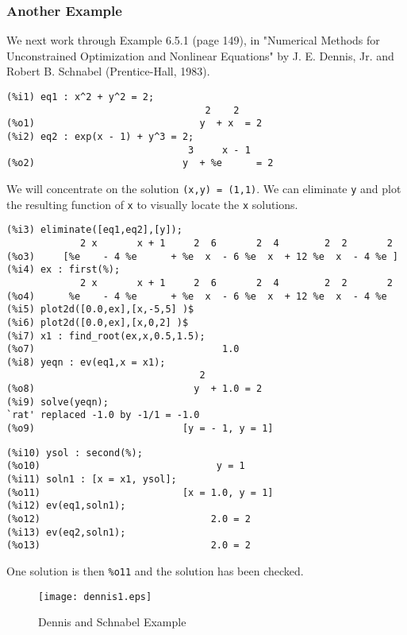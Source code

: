 \documentclass[12pt]{article}
\begin{document}
\subsubsection{Another Example}  
We next work through Example 6.5.1 (page 149), in "Numerical Methods for Unconstrained Optimization
  and Nonlinear Equations" by J. E. Dennis, Jr. and  Robert B. Schnabel (Prentice-Hall, 1983).
\small
\begin{verbatim}
(%i1) eq1 : x^2 + y^2 = 2;
                                   2    2
(%o1)                             y  + x  = 2
(%i2) eq2 : exp(x - 1) + y^3 = 2;
                                3     x - 1
(%o2)                          y  + %e      = 2
\end{verbatim}
\normalsize
We will concentrate on the solution \verb|(x,y) = (1,1)|.
We can eliminate \verb|y| and plot the resulting function of \verb|x|
  to visually locate the \verb|x| solutions.
\small
\begin{verbatim}
(%i3) eliminate([eq1,eq2],[y]);
             2 x       x + 1     2  6       2  4        2  2       2
(%o3)     [%e    - 4 %e      + %e  x  - 6 %e  x  + 12 %e  x  - 4 %e ]
(%i4) ex : first(%);
             2 x       x + 1     2  6       2  4        2  2       2
(%o4)      %e    - 4 %e      + %e  x  - 6 %e  x  + 12 %e  x  - 4 %e
(%i5) plot2d([0.0,ex],[x,-5,5] )$
(%i6) plot2d([0.0,ex],[x,0,2] )$
(%i7) x1 : find_root(ex,x,0.5,1.5);
(%o7)                                 1.0
(%i8) yeqn : ev(eq1,x = x1);
                                  2
(%o8)                            y  + 1.0 = 2
(%i9) solve(yeqn);
`rat' replaced -1.0 by -1/1 = -1.0
(%o9)                          [y = - 1, y = 1]
\end{verbatim}
\newpage
\begin{verbatim}
(%i10) ysol : second(%);
(%o10)                               y = 1
(%i11) soln1 : [x = x1, ysol];
(%o11)                         [x = 1.0, y = 1]
(%i12) ev(eq1,soln1);
(%o12)                              2.0 = 2
(%i13) ev(eq2,soln1);
(%o13)                              2.0 = 2
\end{verbatim}
\normalsize
One solution is then \verb|%o11| and the solution has been checked.\\

\smallskip
\begin{figure} [h]
   \centerline{\texttt{[image: dennis1.eps]} }
	\caption{Dennis and Schnabel Example}
\end{figure}
\end{document}
